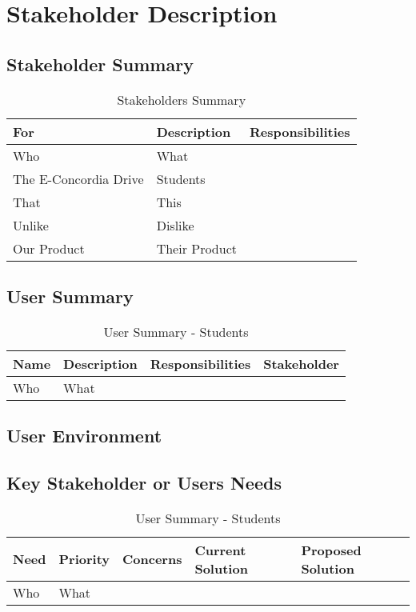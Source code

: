 \documentclass{article}
\begin{document}
\section{Stakeholder Description}

\subsection{Stakeholder Summary}

\begin{table}[h!]
\begin{tabular}{|p{4.5cm}|p{4.5cm}|p{6.5cm}|}
\hline
\textbf{For} & \textbf{Description} & \textbf{Responsibilities} \\ \hline
Who & What & \\ \hline
The E-Concordia Drive & Students &\\ \hline
That & This &\\ \hline
Unlike & Dislike &\\ \hline
Our Product & Their Product &\\ \hline
\end{tabular}
\caption{Stakeholders Summary}
\label{table:3}
\end{table}


\subsection{User Summary}

\begin{table}[h!]
\begin{tabular}{|p{3.5cm}|p{3.5cm}|p{4.5cm}|p{4cm}|}
\hline
\textbf{Name} & \textbf{Description} & \textbf{Responsibilities} & \textbf{Stakeholder}\\ \hline
Who & What & & \\ \hline

\end{tabular}
\caption{User Summary - Students}
\label{table:4}
\end{table}

\subsection{User Environment}

\subsection{Key Stakeholder or Users Needs}

\begin{table}[h!]
\begin{tabular}{|p{2.5cm}|p{2.5cm}|p{3.5cm}|p{3.5cm}|p{3.5cm}|}
\hline
\textbf{Need} & \textbf{Priority} & \textbf{Concerns} & \textbf{Current Solution} & \textbf{Proposed Solution}\\ \hline
Who & What & & &\\ \hline

\end{tabular}
\caption{User Summary - Students}
\label{table:5}
\end{table}
\end{document}
